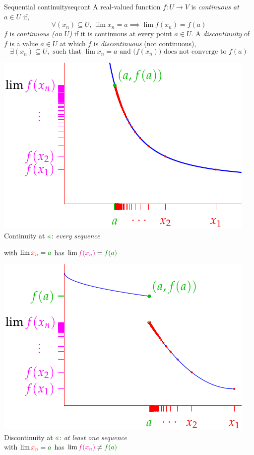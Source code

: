 \begin{defn}{Sequential continuity}{seqcont}
	A real-valued function $f:U\to V$ is \emph{continuous at $a\in U$} if,
	\[
		\forall (x_n)\subseteq U, \
		\lim x_n=a\implies\lim f(x_n)=f(a)
	\]
	$f$ is \emph{continuous (on $U$)} if it is continuous at every point $a\in U$.\smallbreak
	A \emph{discontinuity} of $f$ is a value $a\in U$ at which $f$ is \emph{discontinuous} (not continuous),
	\[
		\exists (x_n)\subseteq U,\text{ such that }\lim x_n=a\text{ and }\bigl(f(x_n)\bigr)\text{ does not converge to $f(a)$}
	\]
	\begin{minipage}[t]{0.49\linewidth}\vspace{0pt}
		\centering
		\includegraphics[scale=0.95]{contdef-pic4}\\
		Continuity at $\textcolor{Green}{a}$: \emph{every sequence}\par
		with $\lim\textcolor{red}{x_n}=\textcolor{Green}{a}$ has $\lim\textcolor{magenta}{f(x_n)}=\textcolor{Green}{f(a)}$
	\end{minipage}
	\hfill
	\begin{minipage}[t]{0.49\linewidth}\vspace{0pt}
		\centering
		\includegraphics[scale=0.95]{contdef-pic2}\\
		Discontinuity at $\textcolor{Green}{a}$: \emph{at least one sequence}\\
		with $\lim\textcolor{red}{x_n}=\textcolor{Green}{a}$ has $\lim\textcolor{magenta}{f(x_n)}\neq \textcolor{Green}{f(a)}$
	\end{minipage}
\end{defn}


